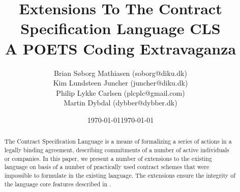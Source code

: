 \documentclass[a4paper,oneside, final, twocolumn]{memoir}
\title{Extensions To The Contract Specification Language CLS\\
        \small{A POETS Coding Extravaganza}}
\author{Brian Søborg Mathiasen (soborg@diku.dk) \\ Kim Lundsteen Juncher (juncher@diku.dk) \\ Philip Lykke Carlsen (plcplc@gmail.com) \\ Martin Dybdal (dybber@dybber.dk)}
\date{\today} %
\date{\today}
\begin{document}
\begin{abstract}
The Contract Specification Language\cite{hvitved10} is a means of formalizing a
series of actions in a legally binding agreement, describing commitments of a
number of active individuals or companies. In this paper, we present a number of
extensions to the existing language on basis of a number of practically used
contract schemes that were impossible to formulate in the existing language. The
extensions ensure the integrity of the language core features described in
\cite{hvitved10}.
\end{abstract}

\maketitle
\newpage

\renewcommand\bibname{References}


\end{document}
